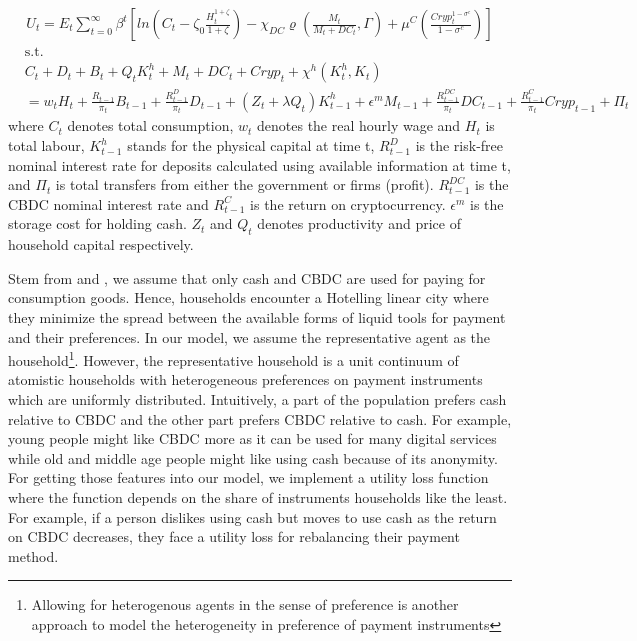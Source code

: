 \documentclass[12pt, a4paper]{article}
\begin{document}
\begin{align}
   U_t=  E_t \sum_{t=0}^{\infty} \beta^t\left[ ln\left(C_t-\zeta_{0}\frac{H_t^{1+\zeta}}{1+\zeta}\right) -\chi_{DC}\varrho\left(\frac{M_t}{M_t+DC_t},\Gamma\right) +\mu^C\left(\frac{Cryp_t^{1-\sigma^c}}{1-\sigma^c}\right)\right] 
\end{align}
\begin{align*}
&\text{s.t.}  \nonumber\\
  & C_t + D_{t} + B_t + Q_t K^h_t  + M_t + DC_t + Cryp_t +\chi^h(K^h_t,K_t) \\   
 & = w_t H_t + \frac{R_{t-1}}{\pi_t} B_{t-1}+ \frac{R^D_{t-1}}{\pi_t} D_{t-1} + (Z_t+ \lambda Q_t) K^h_{t-1} + \epsilon^m M_{t-1} + \frac{R^{DC}_{t-1}}{\pi_t} DC_{t-1} +\frac{R^{C}_{t-1}}{\pi_t} Cryp_{t-1}  +\Pi_t 
\end{align*}
where $C_t$ denotes total consumption, $w_t$ denotes the real hourly wage and $H_t$ is total labour, $K^h_{t-1}$ stands for the physical capital at time t, $R^D_{t-1}$ is the risk-free nominal interest rate for deposits calculated using available information at time t, and $\Pi_t$ is total  transfers from either the government or firms (profit). $R^{DC}_{t-1}$ is the CBDC nominal interest rate and $R^C_{t-1}$ is the return on cryptocurrency. $\epsilon^m$ is the storage cost for holding cash. $Z_t$ and $Q_t$ denotes productivity and price of household capital respectively.

Stem from \cite{agur2022designing} and \cite{minesso2022central}, we assume that only cash and CBDC are used for paying for consumption goods. Hence, households encounter a Hotelling linear city where they minimize the spread between the available forms of liquid tools for payment and their preferences. In our model, we assume the representative agent as the household\footnote{Allowing for heterogenous agents in the sense of preference is another approach to model the heterogeneity in preference of payment instruments}. However, the representative household is a unit continuum of atomistic households with heterogeneous preferences on payment instruments which are uniformly distributed. Intuitively, a part of the population prefers cash relative to CBDC and the other part prefers CBDC relative to cash. For example, young people might like CBDC more as it can be used for many digital services while old and middle age people might like using cash because of its anonymity. For getting those features into our model, we implement a utility loss function where the function depends on the share of instruments households like the least. For example, if a person dislikes using cash but moves to use cash as the return on CBDC decreases, they face a utility loss for rebalancing their payment method.
\end{document}
